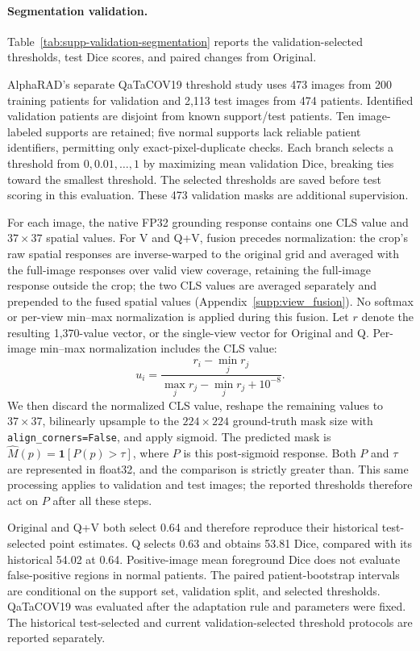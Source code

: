 \paragraph{Segmentation validation.}
\label{supp:segmentation_validation}
Table~\ref{tab:supp-validation-segmentation} reports the validation-selected thresholds, test Dice scores, and paired changes from Original.

AlphaRAD's separate QaTaCOV19 threshold study uses 473 images from 200 training patients for validation and 2,113 test images from 474 patients. Identified validation patients are disjoint from known support/test patients. Ten image-labeled supports are retained; five normal supports lack reliable patient identifiers, permitting only exact-pixel-duplicate checks. Each branch selects a threshold from $0,0.01,\ldots,1$ by maximizing mean validation Dice, breaking ties toward the smallest threshold. The selected thresholds are saved before test scoring in this evaluation. These 473 validation masks are additional supervision.

For each image, the native FP32 grounding response contains one CLS value and $37\times37$ spatial values. For V and Q+V, fusion precedes normalization: the crop's raw spatial responses are inverse-warped to the original grid and averaged with the full-image responses over valid view coverage, retaining the full-image response outside the crop; the two CLS values are averaged separately and prepended to the fused spatial values (Appendix~\ref{supp:view_fusion}). No softmax or per-view min--max normalization is applied during this fusion. Let $r$ denote the resulting 1,370-value vector, or the single-view vector for Original and Q. Per-image min--max normalization includes the CLS value:
\[
u_i=\frac{r_i-\min_j r_j}{\max_j r_j-\min_j r_j+10^{-8}}.
\]
We then discard the normalized CLS value, reshape the remaining values to $37\times37$, bilinearly upsample to the $224\times224$ ground-truth mask size with \texttt{align\_corners=False}, and apply sigmoid. The predicted mask is $\widehat M(p)=\mathbf{1}[P(p)>\tau]$, where $P$ is this post-sigmoid response. Both $P$ and $\tau$ are represented in float32, and the comparison is strictly greater than. This same processing applies to validation and test images; the reported thresholds therefore act on $P$ after all these steps.

Original and Q+V both select 0.64 and therefore reproduce their historical test-selected point estimates. Q selects 0.63 and obtains 53.81 Dice, compared with its historical 54.02 at 0.64. Positive-image mean foreground Dice does not evaluate false-positive regions in normal patients. The paired patient-bootstrap intervals are conditional on the support set, validation split, and selected thresholds. QaTaCOV19 was evaluated after the adaptation rule and parameters were fixed. The historical test-selected and current validation-selected threshold protocols are reported separately.

